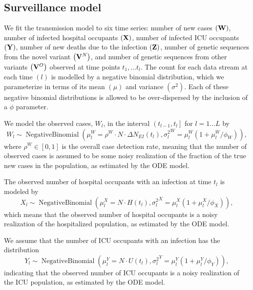 \subsection{Surveillance model}
\label{ch_5:subsec:surveillance}

We fit the transmission model to six time series: number of new cases \( \left( \mathbf{W} \right) \),  number of infected hospital occupants \( \left( \mathbf{X} \right) \), number of infected ICU occupants \( \left( \mathbf{Y} \right) \), number of new deaths due to the infection \( \left( \mathbf{Z} \right) \), number of  genetic sequences from the novel variant \( \left( \mathbf{V}^N \right) \), and number of genetic sequences from other variants \( \left( \mathbf{V}^O \right) \) observed at time points \( t_1, \ldots t_l \).
The count for each data stream at each time \( \left( l \right) \) is modelled by a negative binomial distribution, which we parameterize in terms of its mean \( \left( \mu \right) \) and variance \( \left( \sigma^2 \right) \).
Each of these negative binomial distributions is allowed to be over-dispersed by the inclusion of a \( \phi \) parameter.

We model the observed cases, \( W_l \), in the interval \( \left( t_{l - 1}, t_l \right] \) for \( l =1 \ldots L \) by
\begin{equation}
W_l \sim \operatorname{Negative Binomial} \left( \mu^{W}_l = \rho^W \cdot N \cdot \Delta N_{EI} \left( t_l \right), {\sigma^2_l}^{W} = \mu^{W}_l \left( 1 + \mu^{W}_l / \phi_W \right) \right),
\label{ch_5:eqn:case_emission}
\end{equation}
where \( \rho^W \in [0,1]\) is the overall case detection rate, meaning that the number of observed cases is assumed to be some noisy realization of the fraction of the true new cases in the population, as estimated by the ODE model.

The observed number of hospital occupants with an infection at time \( t_l \) is modeled by
\begin{equation}
X_l \sim \operatorname{Negative Binomial} \left( \mu^{X}_l = N \cdot H \left( t_l \right), {\sigma^2_l}^{X} = \mu^{X}_l \left( 1 + \mu^{X}_l / \phi_X \right) \right),
\label{ch_5:eqn:hosp_emission}
\end{equation}
which means that the observed number of hospital occupants is a noisy realization of the hospitalized population, as estimated by the ODE model.

We assume that the number of ICU occupants with an infection has the distribution
\begin{equation}
Y_l \sim \operatorname{Negative Binomial} \left( \mu^{Y}_l = N \cdot U \left( t_l \right), {\sigma^2_l}^{Y} = \mu^{Y}_l \left( 1 + \mu^{Y}_l / \phi_Y \right) \right),
\label{ch_5:eqn:icu_emission}
\end{equation}
indicating that the observed number of ICU occupants is a noisy realization of the ICU population, as estimated by the ODE model.

